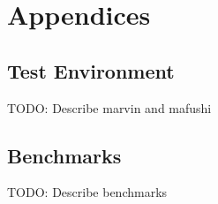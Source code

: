 
\part{Appendices}
\label{part:appendices}

\chapter{Test Environment}
\label{chap:appendix-test-environment}

TODO: Describe marvin and mafushi


\chapter{Benchmarks}
\label{chap:appendix-benchmarks}

TODO: Describe benchmarks

